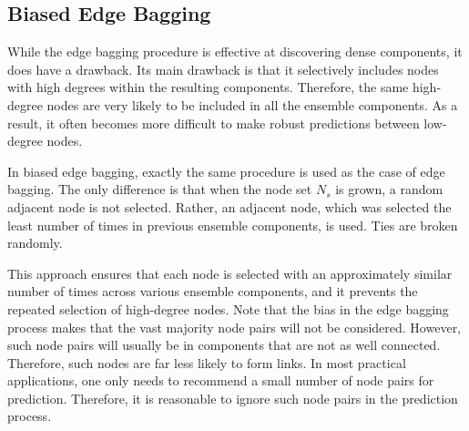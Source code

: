 \subsection{Biased Edge Bagging}

While the edge bagging procedure is effective at discovering dense
components, it does have a drawback. Its main drawback is that  it
selectively includes nodes with  high degrees within the resulting
components.  Therefore, the same high-degree nodes are very likely to be included in
all the ensemble components.  As a result, it often becomes more
difficult to make robust predictions between low-degree nodes.

In biased edge bagging, exactly the same procedure is used as the case
of edge bagging.  The only difference is that when the node set
$N_s$ is grown, a random adjacent node is not selected. Rather, an
adjacent node, which was selected the least number of times
in previous ensemble components, is used. Ties are broken randomly.

This approach ensures  that each node is selected with an approximately
similar number of times across various ensemble components, and it
prevents the repeated selection of high-degree nodes.
%
Note that the
bias in the edge bagging process makes that the vast majority node
pairs will not be considered.
However, such node pairs will usually be in components that are not
as well connected. Therefore, such nodes  are far less likely to
form links. In most practical applications, one only needs to
recommend a small number of node pairs for prediction.  Therefore,
it is reasonable to ignore such node pairs in the prediction
process.



